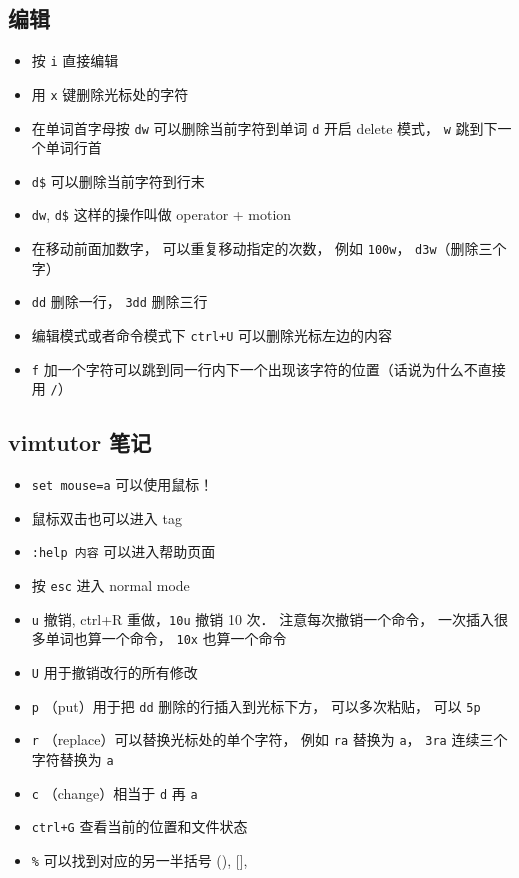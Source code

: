 \subsection{编辑}
\begin{itemize}
\item 按 \verb`i` 直接编辑
\item 用 \verb`x` 键删除光标处的字符
\item 在单词首字母按 \verb`dw` 可以删除当前字符到单词 \verb`d` 开启 delete 模式， \verb`w` 跳到下一个单词行首
\item \verb`d$` 可以删除当前字符到行末 
\item \verb`dw`, \verb`d$` 这样的操作叫做 operator + motion
\item 在移动前面加数字， 可以重复移动指定的次数， 例如 \verb`100w`， \verb`d3w`（删除三个字）
\item \verb`dd` 删除一行， \verb`3dd` 删除三行
\item 编辑模式或者命令模式下 \verb`ctrl+U` 可以删除光标左边的内容
\item \verb`f` 加一个字符可以跳到同一行内下一个出现该字符的位置（话说为什么不直接用 \verb`/`）
\end{itemize}

\subsection{vimtutor 笔记}
\begin{itemize}
\item \verb`set mouse=a` 可以使用鼠标！
\item 鼠标双击也可以进入 tag
\item \verb`:help 内容` 可以进入帮助页面
\item 按 \verb`esc` 进入 normal mode
\item \verb`u` 撤销, ctrl+R 重做，\verb`10u` 撤销 10 次． 注意每次撤销一个命令， 一次插入很多单词也算一个命令， \verb`10x` 也算一个命令
\item \verb`U` 用于撤销改行的所有修改
\item \verb`p` （put）用于把 \verb`dd` 删除的行插入到光标下方， 可以多次粘贴， 可以 \verb`5p`
\item \verb`r` （replace）可以替换光标处的单个字符， 例如 \verb`ra` 替换为 \verb`a`， \verb`3ra` 连续三个字符替换为 \verb`a`
\item \verb`c` （change）相当于 \verb`d` 再 \verb`a`
\item \verb`ctrl+G` 查看当前的位置和文件状态
\item \verb`%` 可以找到对应的另一半括号 (), [], {}
\end{itemize}

